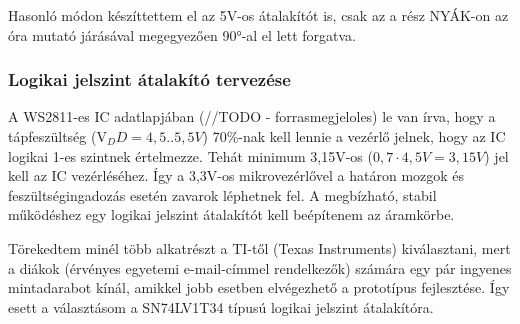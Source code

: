 \documentclass[../main.tex]{subfiles}
\begin{document}
            Hasonló módon készíttettem el az 5V-os átalakítót is, csak az a rész NYÁK-on az óra mutató járásával megegyezően 90°-al el lett forgatva.
            
        \subsubsection{Logikai jelszint átalakító tervezése}
            A WS2811-es IC adatlapjában (//TODO - forrasmegjeloles) le van írva, hogy a tápfeszültség (V$_DD = 4,5..5,5V$) 70\%-nak kell lennie a vezérlő jelnek, hogy az IC logikai 1-es szintnek értelmezze. Tehát minimum 3,15V-os ($0,7\cdot4,5V=3,15V$) jel kell az IC vezérléséhez. Így a 3,3V-os mikrovezérlővel a határon mozgok és feszültségingadozás esetén zavarok léphetnek fel. A megbízható, stabil működéshez egy logikai jelszint átalakítót kell beépítenem az áramkörbe. 

            Törekedtem minél több alkatrészt a TI-től (Texas Instruments) kiválasztani, mert a diákok (érvényes egyetemi e-mail-címmel rendelkezők) számára egy pár ingyenes mintadarabot kínál, amikkel jobb esetben elvégezhető a prototípus fejlesztése. Így esett a választásom a SN74LV1T34 típusú logikai jelszint átalakítóra.
            
            \begin{figure}[h!]
                \begin{floatrow}
                \end{floatrow}
            \end{figure}
            
\end{document}
